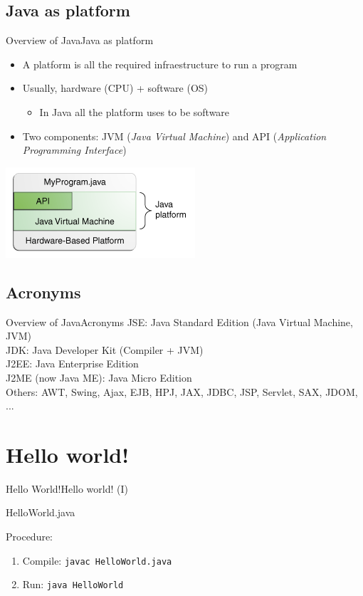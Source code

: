 \documentclass{beamer}
\begin{document}
\subsection[Java as platform]{Java as platform}
\begin{frame}{Overview of Java}{Java as platform}
	\begin{itemize}
	\item A platform is all the required infraestructure to run a program
	\item Usually, hardware (CPU) + software (OS)
		\begin{itemize}
		\item In Java all the platform uses to be software
		\end{itemize}
	\item Two components: JVM (\textit{Java Virtual Machine}) and API (\textit{Application Programming Interface})
	\end{itemize}
	\centering\includegraphics[width=0.5\linewidth]{figs/getStarted-jvm}\\
\end{frame}

\subsection[Acronyms]{Acronyms}
\begin{frame}{Overview of Java}{Acronyms}
	JSE: Java Standard Edition (Java Virtual Machine, JVM)\\
	JDK: Java Developer Kit (Compiler + JVM)\\
	J2EE: Java Enterprise Edition\\
	J2ME (now Java ME): Java Micro Edition\\
	Others: AWT, Swing, Ajax, EJB, HPJ, JAX, JDBC, JSP, Servlet, SAX, JDOM, ...
\end{frame}

\section[Hello world!]{Hello world!}
\begin{frame}{Hello World!}{Hello world! (I)}
	\vspace{-0.2cm}
	\begin{block}{HelloWorld.java}
		
	\end{block}

	Procedure:
	\begin{enumerate}
		\item Compile: \texttt{javac HelloWorld.java}
		\item Run: \texttt{java HelloWorld}
	\end{enumerate}
\end{frame}
\end{document}
